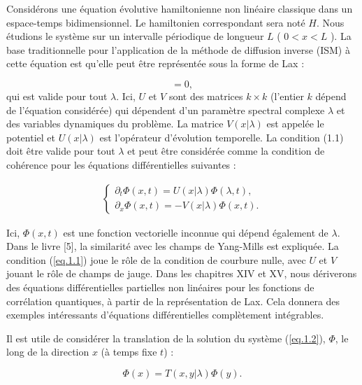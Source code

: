 Considérons une équation évolutive hamiltonienne non linéaire classique dans un espace-temps bidimensionnel. Le hamiltonien correspondant sera noté \( H \). Nous étudions le système sur un intervalle périodique de longueur \( L \) ( \( 0 < x < L \) ). La base traditionnelle pour l'application de la méthode de diffusion inverse (ISM) à cette équation est qu'elle peut être représentée sous la forme de Lax :

\begin{equation}
    [\partial_t U(x|\lambda), \partial_x + V(x|\lambda)] = 0,\label{eq.1.1}
\end{equation}
qui est valide pour tout \( \lambda \). Ici, \( U \) et \( V \) sont des matrices \( k \times k \) (l'entier \( k \) dépend de l'équation considérée) qui dépendent d'un paramètre spectral complexe \( \lambda \) et des variables dynamiques du problème. La matrice \( V(x|\lambda) \) est appelée le potentiel et \( U(x|\lambda) \) est l'opérateur d'évolution temporelle. La condition (1.1) doit être valide pour tout \( \lambda \) et peut être considérée comme la condition de cohérence pour les équations différentielles suivantes :

\begin{eqnarray}
	\left \{ \begin{array}{rcl} \partial_t \Phi(x,t) = U(x|\lambda) \Phi(\lambda,t), \\ \partial_x \Phi(x,t) = - V(x|\lambda) \Phi(x,t). \end{array} \right . \label{eq.1.2}
\end{eqnarray}
    

Ici, \( \Phi(x,t) \) est une fonction vectorielle inconnue qui dépend également de \( \lambda \). Dans le livre [5], la similarité avec les champs de Yang-Mills est expliquée. La condition (\ref{eq.1.1}) joue le rôle de la condition de courbure nulle, avec \( U \) et \( V \) jouant le rôle de champs de jauge. Dans les chapitres XIV et XV, nous dériverons des équations différentielles partielles non linéaires pour les fonctions de corrélation quantiques, à partir de la représentation de Lax. Cela donnera des exemples intéressants d'équations différentielles complètement intégrables.

Il est utile de considérer la translation de la solution du système (\ref{eq.1.2}), \( \Phi \), le long de la direction \( x \) (à temps fixe \( t \)) :

\begin{equation}
    \Phi(x) = T(x,y|\lambda) \Phi(y).\label{eq.1.3}
\end{equation}

